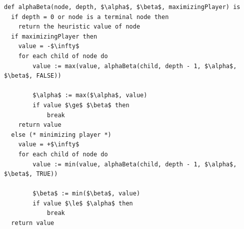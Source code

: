 \documentclass[conference,pdf,table,xcdraw, utf8]{IEEEtran}
\begin{document}
\begin{lstlisting}[linewidth=\columnwidth,breaklines=true,mathescape=true,
caption=Fail-soft variation]
def alphaBeta(node, depth, $\alpha$, $\beta$, maximizingPlayer) is
  if depth = 0 or node is a terminal node then
    return the heuristic value of node
  if maximizingPlayer then
    value = -$\infty$
    for each child of node do
        value := max(value, alphaBeta(child, depth - 1, $\alpha$, $\beta$, FALSE))
        
        $\alpha$ := max($\alpha$, value)
        if value $\ge$ $\beta$ then
            break
    return value
  else (* minimizing player *)
    value = +$\infty$
    for each child of node do
        value := min(value, alphaBeta(child, depth - 1, $\alpha$, $\beta$, TRUE))
                                  
        $\beta$ := min($\beta$, value)
        if value $\le$ $\alpha$ then
            break
  return value
\end{lstlisting}
\end{document}
